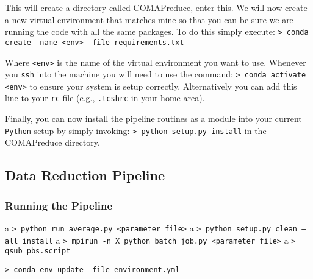 \documentclass[11pt]{article}
\begin{document}
This will create a directory called COMAPreduce, enter this. We will now create a new virtual environment that matches mine so that you can be sure we are running the code with all the same packages. To do this simply execute:
\newline\noindent
\texttt{> conda create --name <env> --file requirements.txt}
\newline\noindent

Where \texttt{<env>} is the name of the virtual environment you want to use. Whenever you \texttt{ssh} into the machine you will need to use the command:
\newline\noindent
\texttt{> conda activate <env>}
\newline\noindent
to ensure your system is setup correctly. Alternatively you can add this line to your \texttt{rc} file (e.g., \texttt{.tcshrc} in your home area).

Finally, you can now install the pipeline routines as a module into your current \texttt{Python} setup by simply invoking:
\newline\noindent
\texttt{> python setup.py install}
\newline\noindent
in the COMAPreduce directory. 

\subsection{Data Reduction Pipeline}

\subsubsection{Running the Pipeline}
a
\newline\noindent
\texttt{> python run\_average.py <parameter\_file>}
\newline\noindent
a
\newline\noindent
\texttt{> python setup.py clean --all install}
\newline\noindent
a
\newline\noindent
\texttt{> mpirun -n X python batch\_job.py <parameter\_file>}
\newline\noindent
a
\newline\noindent
\texttt{> qsub pbs.script}
\newline\noindent

\newline\noindent
\texttt{> conda env update --file environment.yml}
\newline\noindent
\end{document}
